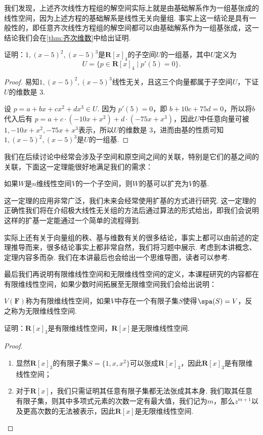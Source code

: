 我们发现，上述齐次线性方程组的解空间实际上就是由基础解系作为一组基张成的线性空间，因为上述方程的基础解系是线性无关向量组. 事实上这一结论是具有一般性的，即任意齐次线性方程组的解空间都可以由基础解系作为一组基张成，这一结论我们会在\autoref{thm:齐次维数}中给出证明.

\begin{example}{}{}
    证明：$1,(x-5)^2,(x-5)^3$是$\mathbf{R}[x]_4$的子空间$U$的一组基，其中$U$定义为
    \[U=\{p\in\mathbf{R}[x]_4 \mid p'(5)=0\}.\]
\end{example}

\begin{proof}
    易知$1,(x-5)^2,(x-5)^3$线性无关，且这三个向量都属于子空间$U$，下证$U$的维数是 3.

    设 $p = a + bx + cx^2 + dx^3 \in U$. 因为 $p'(5) = 0$，即 $b + 10c +75d = 0$，所以将$b$代入后有 $p = a + c·(-10x + x^2) + d·(-75x + x^3)$，因此$U$中任意向量可被$1, -10x + x^2, -75x + x^3$表示，所以$U$的维数是 3，进而由基的性质可知$1,(x-5)^2,(x-5)^3$是$U$的一组基.
\end{proof}

我们在后续讨论中经常会涉及子空间和原空间之间的关联，特别是它们的基之间的关联，下面这一定理能很好地满足我们的需求：
\begin{theorem}{}{}
    如果$W$是$n$维线性空间$V$的一个子空间，则$W$的基可以扩充为$V$的基.
\end{theorem}
这一定理的应用非常广泛，我们未来会经常使用扩基的方式进行研究. 这一定理的正确性我们将在介绍极大线性无关组的方法后通过算法的形式给出，即我们会说明这样的扩基一定能通过一个简单的流程得到.

实际上还有关于向量组的秩、基与维数有关的很多结论，事实上都可以由前述的定理推导而来，很多结论事实上都非常自然，我们将习题中展示. 考虑到本讲概念、定理内容多而杂. 我们在本讲最后也会给出一个思维导图，读者可以参考.

最后我们再说明有限维线性空间和无限维线性空间的定义，本课程研究的内容都在有限维线性空间，如果少数时间拓展至无限维空间我们会给出说明：
\begin{definition}{}{}
    $V(\mathbf{F})$称为有限维线性空间，如果$V$中存在一个有限子集$S$使得$\spa(S)=V$，反之称为无限维线性空间.
\end{definition}

\begin{example}{}{}
    证明：$\mathbf{R}[x]_3$是有限维线性空间，$\mathbf{R}[x]$是无限维线性空间.
\end{example}

\begin{proof}
    \begin{enumerate}
        \item 显然$\mathbf{R}[x]_3$的有限子集$S=\{1,x,x^2\}$可以张成$\mathbf{R}[x]_3$，因此$\mathbf{R}[x]_3$是有限维线性空间；

        \item 对于$\mathbf{R}[x]$，我们只需证明其任意有限子集都无法张成其本身. 我们取其任意有限子集，则其中多项式元素的次数一定有最大值，我们记为$m$，那么$z^{m+1}$以及更高次数的无法被表示，因此$\mathbf{R}[x]$是无限维线性空间.
    \end{enumerate}
\end{proof}

